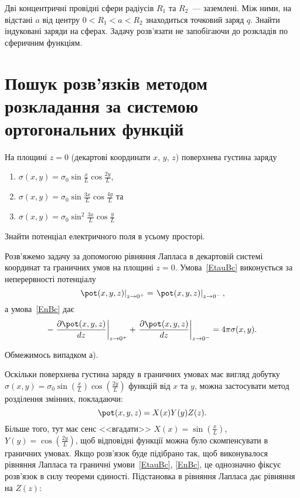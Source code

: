 \begin{problem}
Дві концентричні провідні сфери радіусів  $R_1$ та $R_2$~--- заземлені. Між ними, на відстані $a$  від центру $0< R_1<a<R_2$  знаходиться точковий заряд  $q$. Знайти індуковані заряди на сферах. Задачу розв'язати не запобігаючи до розкладів по сферичним функціям.
\end{problem}

\section{Пошук розв'язків методом розкладання за системою ортогональних функцій}
\begin{problem}\label{prb:charged_plates}
На площині $z=0$ (декартові координати $x$, $y$, $z$) поверхнева густина заряду
\begin{enumerate}[label=\alph*)]
	\item $\sigma(x, y) = \sigma_0 \sin\frac{x}{L}\cos\frac{2y}{L}$,
	\item  $\sigma(x, y) = \sigma_0 \sin\frac{3x}{L}\cos\frac{4y}{L}$ та
	\item  $\sigma(x, y) = \sigma_0 \sin^2\frac{3x}{L}\cos\frac{y}{L}$
\end{enumerate}
Знайти потенціал електричного поля в усьому просторі.
\begin{solution}
    Розв'яжемо задачу за допомогою рівняння Лапласа в декартовій системі координат  та граничних умов на площині $z = 0$. Умова~\eqref{EtauBc} виконується за неперервності потенціалу
	\begin{equation*}\label{continuity}
		\left.\pot(x,y,z)\right|_{z \to 0^+} = \left.\pot(x,y,z)\right|_{z \to 0^-},
	\end{equation*}
	а умова~\eqref{EnBc} дає
	\begin{equation*}\label{boundary}
		-\left. \frac{\partial \pot(x,y,z)}{dz}\right|_{z \to 0^+} + \left. \frac{\partial \pot(x,y,z)}{dz}\right|_{z \to 0^-} =4\pi\sigma(x,y).
	\end{equation*}

	Обмежимось випадком а).

	Оскільки поверхнева густина заряду в граничних умовах має вигляд добутку $\sigma(x, y) = \sigma_0 \sin\left( \frac{x}{L}\right) \cos\left( \frac{2y}{L}\right) $ функцій від $x$ та $y$, можна застосувати метод розділення змінних, покладаючи:
    \[
        \pot(x,y,z) = X(x)Y(y)Z(z).
    \]
Більше того, тут має сенс <<вгадати>> $X(x) = \sin\left(\frac{x}{L}\right) $, $Y(y) = \cos\left(\frac{2y}{L}\right) $, щоб відповідні функції можна було скомпенсувати в граничних умовах. Якщо розв’язок буде підібрано так, щоб виконувалося рівняння Лапласа та граничні умови~\eqref{EtauBc}, \eqref{EnBc}, це однозначно фіксує розв'язок в силу теореми єдиності. Підстановка в рівняння Лапласа дає рівняння на $Z(z)$:


\end{solution}
\end{problem}
